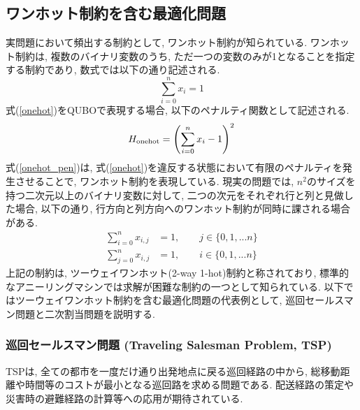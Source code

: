 \documentclass[submit,techrep,noauthor]{ipsj}
\begin{document}
\subsection{ワンホット制約を含む最適化問題}
実問題において頻出する制約として, ワンホット制約が知られている. ワンホット制約は, 複数のバイナリ変数のうち, ただ一つの変数のみが1となることを指定する制約であり, 数式では以下の通り記述される.
\begin{equation}
\sum_{i=0}^{n}x_{i} = 1 \label{onehot}
\end{equation}
式(\ref{onehot})をQUBOで表現する場合, 以下のペナルティ関数として記述される.
\begin{equation}
H_{{\rm onehot}}=\left(\sum_{i=0}^{n}x_{i} - 1\right)^{2} \label{onehot_pen}
\end{equation}
式(\ref{onehot_pen})は, 式(\ref{onehot})を違反する状態において有限のペナルティを発生させることで, ワンホット制約を表現している. 現実の問題では, $n^{2}$のサイズを持つ二次元以上のバイナリ変数に対して, 二つの次元をそれぞれ行と列と見做した場合, 以下の通り, 行方向と列方向へのワンホット制約が同時に課される場合がある.
\begin{align}
\sum_{i=0}^{n}x_{i, j} &= 1,\hspace{2em}j\in\{0,1,...n\}\\
\sum_{j=0}^{n}x_{i, j} &= 1,\hspace{2em}i\in\{0,1,...n\}
\end{align}
上記の制約は, ツーウェイワンホット(2-way 1-hot)制約と称されており\cite{yatabe}, 標準的なアニーリングマシンでは求解が困難な制約の一つとして知られている\cite{da3}. 以下ではツーウェイワンホット制約を含む最適化問題の代表例として, 巡回セールスマン問題と二次割当問題を説明する.

\subsubsection{巡回セールスマン問題 (Traveling Salesman Problem, TSP)}
TSPは, 全ての都市を一度だけ通り出発地点に戻る巡回経路の中から, 総移動距離や時間等のコストが最小となる巡回路を求める問題である. 配送経路の策定や災害時の避難経路の計算等への応用\cite{tsunami}が期待されている. 
\end{document}
